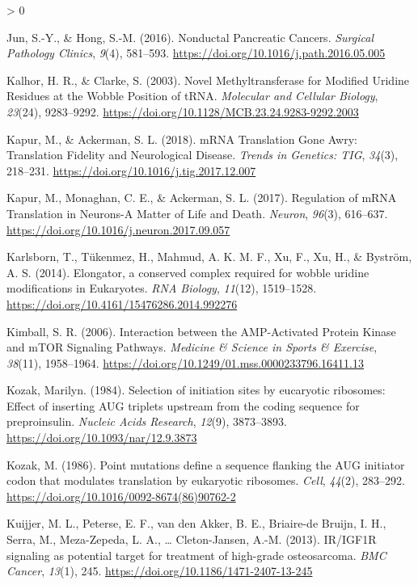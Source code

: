 \documentclass[
  12pt,
  openany]{book}
\newlength{\cslhangindent}
\newenvironment{CSLReferences}[2] %
 {%
  \setlength{\parindent}{0pt}
  \ifodd #1 \everypar{\setlength{\hangindent}{\cslhangindent}}\ignorespaces\fi
  \ifnum #2 > 0
  \setlength{\parskip}{#2\baselineskip}
  \fi
 }%
 {}
\begin{document}
\begin{CSLReferences}{1}{0}
\leavevmode\hypertarget{ref-Jun2016}{}%
Jun, S.-Y., \& Hong, S.-M. (2016). Nonductal {Pancreatic Cancers}. \emph{Surgical Pathology Clinics}, \emph{9}(4), 581--593. \url{https://doi.org/10.1016/j.path.2016.05.005}

\leavevmode\hypertarget{ref-Kalhor2003}{}%
Kalhor, H. R., \& Clarke, S. (2003). Novel {Methyltransferase} for {Modified Uridine Residues} at the {Wobble Position} of {tRNA}. \emph{Molecular and Cellular Biology}, \emph{23}(24), 9283--9292. \url{https://doi.org/10.1128/MCB.23.24.9283-9292.2003}

\leavevmode\hypertarget{ref-Kapur2018}{}%
Kapur, M., \& Ackerman, S. L. (2018). {mRNA Translation Gone Awry}: {Translation Fidelity} and {Neurological Disease}. \emph{Trends in Genetics: TIG}, \emph{34}(3), 218--231. \url{https://doi.org/10.1016/j.tig.2017.12.007}

\leavevmode\hypertarget{ref-Kapur2017}{}%
Kapur, M., Monaghan, C. E., \& Ackerman, S. L. (2017). Regulation of {mRNA Translation} in {Neurons}-{A Matter} of {Life} and {Death}. \emph{Neuron}, \emph{96}(3), 616--637. \url{https://doi.org/10.1016/j.neuron.2017.09.057}

\leavevmode\hypertarget{ref-Karlsborn2014}{}%
Karlsborn, T., Tükenmez, H., Mahmud, A. K. M. F., Xu, F., Xu, H., \& Byström, A. S. (2014). Elongator, a conserved complex required for wobble uridine modifications in {Eukaryotes}. \emph{RNA Biology}, \emph{11}(12), 1519--1528. \url{https://doi.org/10.4161/15476286.2014.992276}

\leavevmode\hypertarget{ref-Kimball2006}{}%
Kimball, S. R. (2006). Interaction between the {AMP}-{Activated Protein Kinase} and {mTOR Signaling Pathways}. \emph{Medicine \& Science in Sports \& Exercise}, \emph{38}(11), 1958--1964. \url{https://doi.org/10.1249/01.mss.0000233796.16411.13}

\leavevmode\hypertarget{ref-Kozak1984}{}%
Kozak, Marilyn. (1984). Selection of initiation sites by eucaryotic ribosomes: Effect of inserting {AUG} triplets upstream from the coding sequence for preproinsulin. \emph{Nucleic Acids Research}, \emph{12}(9), 3873--3893. \url{https://doi.org/10.1093/nar/12.9.3873}

\leavevmode\hypertarget{ref-Kozak1986}{}%
Kozak, M. (1986). Point mutations define a sequence flanking the {AUG} initiator codon that modulates translation by eukaryotic ribosomes. \emph{Cell}, \emph{44}(2), 283--292. \url{https://doi.org/10.1016/0092-8674(86)90762-2}

\leavevmode\hypertarget{ref-Kuijjer2013}{}%
Kuijjer, M. L., Peterse, E. F., van den Akker, B. E., Briaire-de Bruijn, I. H., Serra, M., Meza-Zepeda, L. A., \ldots{} Cleton-Jansen, A.-M. (2013). {IR}/{IGF1R} signaling as potential target for treatment of high-grade osteosarcoma. \emph{BMC Cancer}, \emph{13}(1), 245. \url{https://doi.org/10.1186/1471-2407-13-245}


\end{CSLReferences}
\end{document}
